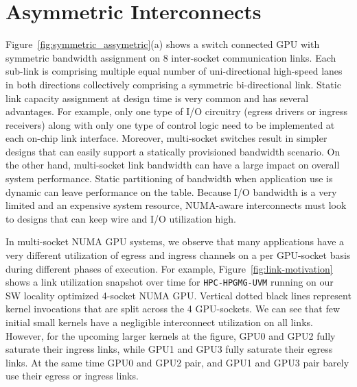 \section{Asymmetric Interconnects}
\label{sec:interconnect}

Figure~\ref{fig:symmetric_assymetric}(a) shows a switch connected GPU
with symmetric bandwidth assignment on 8 inter-socket communication links.
Each sub-link is comprising multiple equal number of uni-directional high-speed
lanes in both directions collectively comprising a symmetric bi-directional
link.  Static link capacity assignment at design time is very common and has
several advantages. For example, only one type of I/O circuitry
(egress drivers or ingress receivers) along with only one type of control logic
need to be implemented at each on-chip link interface. Moreover, multi-socket
switches result in simpler designs that can easily support a statically provisioned
bandwidth scenario. On the other hand, multi-socket link bandwidth can have
a large impact on overall system performance.  Static partitioning of bandwidth
when application use is dynamic can leave performance on the table.
Because I/O bandwidth is a very limited and an expensive system resource, NUMA-aware
interconnects must look to designs that can keep wire and I/O
utilization high. 

In multi-socket NUMA GPU systems, we observe that many applications have a very 
different utilization of egress and ingress channels on a per GPU-socket basis
during different phases of execution. For example,
Figure~\ref{fig:link-motivation} shows a link utilization snapshot over time for
\texttt{HPC-HPGMG-UVM} running on our SW locality optimized 4-socket NUMA GPU. 
Vertical dotted black lines represent
kernel invocations that are split across the 4 GPU-sockets. We can see that few initial small kernels have a
negligible interconnect utilization on all links. However, for the upcoming
larger kernels at the figure, GPU0 and GPU2 fully saturate their ingress links,
while GPU1 and GPU3 fully saturate their egress links. At the same time GPU0 
and GPU2 pair, and GPU1 and GPU3 pair barely use their egress or ingress links.

